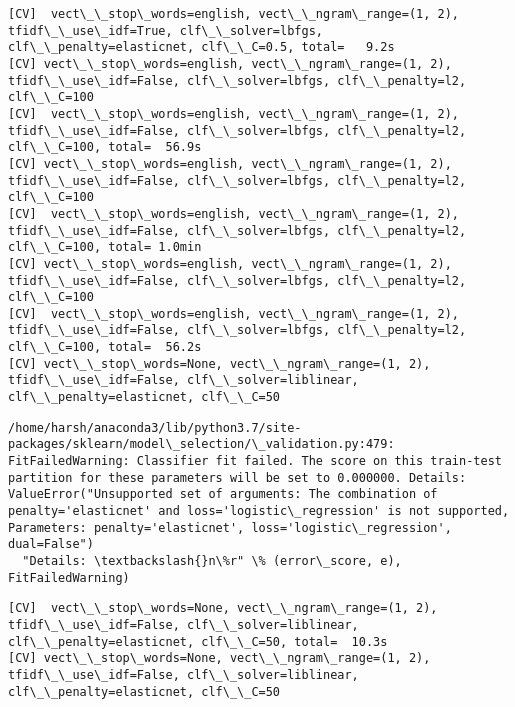 \documentclass[11pt]{article}
\begin{document}
    \begin{Verbatim}[commandchars=\\\{\}]
[CV]  vect\_\_stop\_words=english, vect\_\_ngram\_range=(1, 2), tfidf\_\_use\_idf=True, clf\_\_solver=lbfgs, clf\_\_penalty=elasticnet, clf\_\_C=0.5, total=   9.2s
[CV] vect\_\_stop\_words=english, vect\_\_ngram\_range=(1, 2), tfidf\_\_use\_idf=False, clf\_\_solver=lbfgs, clf\_\_penalty=l2, clf\_\_C=100 
[CV]  vect\_\_stop\_words=english, vect\_\_ngram\_range=(1, 2), tfidf\_\_use\_idf=False, clf\_\_solver=lbfgs, clf\_\_penalty=l2, clf\_\_C=100, total=  56.9s
[CV] vect\_\_stop\_words=english, vect\_\_ngram\_range=(1, 2), tfidf\_\_use\_idf=False, clf\_\_solver=lbfgs, clf\_\_penalty=l2, clf\_\_C=100 
[CV]  vect\_\_stop\_words=english, vect\_\_ngram\_range=(1, 2), tfidf\_\_use\_idf=False, clf\_\_solver=lbfgs, clf\_\_penalty=l2, clf\_\_C=100, total= 1.0min
[CV] vect\_\_stop\_words=english, vect\_\_ngram\_range=(1, 2), tfidf\_\_use\_idf=False, clf\_\_solver=lbfgs, clf\_\_penalty=l2, clf\_\_C=100 
[CV]  vect\_\_stop\_words=english, vect\_\_ngram\_range=(1, 2), tfidf\_\_use\_idf=False, clf\_\_solver=lbfgs, clf\_\_penalty=l2, clf\_\_C=100, total=  56.2s
[CV] vect\_\_stop\_words=None, vect\_\_ngram\_range=(1, 2), tfidf\_\_use\_idf=False, clf\_\_solver=liblinear, clf\_\_penalty=elasticnet, clf\_\_C=50 

    \end{Verbatim}

    \begin{Verbatim}[commandchars=\\\{\}]
/home/harsh/anaconda3/lib/python3.7/site-packages/sklearn/model\_selection/\_validation.py:479: FitFailedWarning: Classifier fit failed. The score on this train-test partition for these parameters will be set to 0.000000. Details: 
ValueError("Unsupported set of arguments: The combination of penalty='elasticnet' and loss='logistic\_regression' is not supported, Parameters: penalty='elasticnet', loss='logistic\_regression', dual=False")
  "Details: \textbackslash{}n\%r" \% (error\_score, e), FitFailedWarning)

    \end{Verbatim}

    \begin{Verbatim}[commandchars=\\\{\}]
[CV]  vect\_\_stop\_words=None, vect\_\_ngram\_range=(1, 2), tfidf\_\_use\_idf=False, clf\_\_solver=liblinear, clf\_\_penalty=elasticnet, clf\_\_C=50, total=  10.3s
[CV] vect\_\_stop\_words=None, vect\_\_ngram\_range=(1, 2), tfidf\_\_use\_idf=False, clf\_\_solver=liblinear, clf\_\_penalty=elasticnet, clf\_\_C=50 

    \end{Verbatim}
\end{document}
